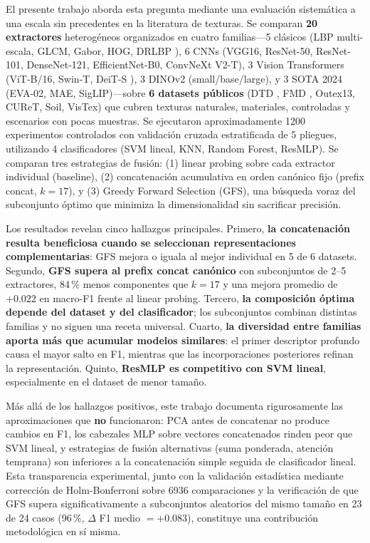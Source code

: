 \documentclass[a4paper,fleqn]{cas-sc}
\begin{document}
El presente trabajo aborda esta pregunta mediante una evaluaci\'on sistem\'atica a una escala sin precedentes en la literatura de texturas. Se comparan \textbf{20 extractores} heterog\'eneos organizados en cuatro familias---5 cl\'asicos (LBP multi-escala, GLCM, Gabor, HOG, DRLBP \citep{mehta2011drlbp}), 6 CNNs (VGG16, ResNet-50, ResNet-101, DenseNet-121, EfficientNet-B0, ConvNeXt V2-T), 3 Vision Transformers (ViT-B/16, Swin-T, DeiT-S \citep{touvron2021deit}), 3 DINOv2 (small/base/large), y 3 SOTA 2024 (EVA-02, MAE, SigLIP)---sobre \textbf{6 datasets p\'ublicos} (DTD \citep{cimpoi2014dtd}, FMD \citep{sharan2013fmd}, Outex13, CUReT, Soil, VisTex) que cubren texturas naturales, materiales, controladas y escenarios con pocas muestras. Se ejecutaron aproximadamente 1200 experimentos controlados con validaci\'on cruzada estratificada de 5 pliegues, utilizando 4 clasificadores (SVM lineal, KNN, Random Forest, ResMLP). Se comparan tres estrategias de fusi\'on: (1) linear probing sobre cada extractor individual (baseline), (2) concatenaci\'on acumulativa en orden can\'onico fijo (prefix concat, $k=17$), y (3) Greedy Forward Selection (GFS), una b\'usqueda voraz del subconjunto \'optimo que minimiza la dimensionalidad sin sacrificar precisi\'on.

Los resultados revelan cinco hallazgos principales. Primero, \textbf{la concatenaci\'on resulta beneficiosa cuando se seleccionan representaciones complementarias}: GFS mejora o iguala al mejor individual en 5 de 6 datasets. Segundo, \textbf{GFS supera al prefix concat can\'onico} con subconjuntos de 2--5 extractores, 84\,\% menos componentes que $k=17$ y una mejora promedio de $+0.022$ en macro-F1 frente al linear probing. Tercero, \textbf{la composici\'on \'optima depende del dataset y del clasificador}; los subconjuntos combinan distintas familias y no siguen una receta universal. Cuarto, \textbf{la diversidad entre familias aporta m\'as que acumular modelos similares}: el primer descriptor profundo causa el mayor salto en F1, mientras que las incorporaciones posteriores refinan la representaci\'on. Quinto, \textbf{ResMLP es competitivo con SVM lineal}, especialmente en el dataset de menor tama\~no.

M\'as all\'a de los hallazgos positivos, este trabajo documenta rigurosamente las aproximaciones que \textbf{no} funcionaron: PCA antes de concatenar no produce cambios en F1, los cabezales MLP sobre vectores concatenados rinden peor que SVM lineal, y estrategias de fusi\'on alternativas (suma ponderada, atenci\'on temprana) son inferiores a la concatenaci\'on simple seguida de clasificador lineal. Esta transparencia experimental, junto con la validaci\'on estad\'istica mediante correcci\'on de Holm-Bonferroni sobre 6936 comparaciones y la verificaci\'on de que GFS supera significativamente a subconjuntos aleatorios del mismo tama\~no en 23 de 24 casos (96\,\%, $\Delta$ F1 medio $= +0.083$), constituye una contribuci\'on metodol\'ogica en s\'i misma.
\end{document}
